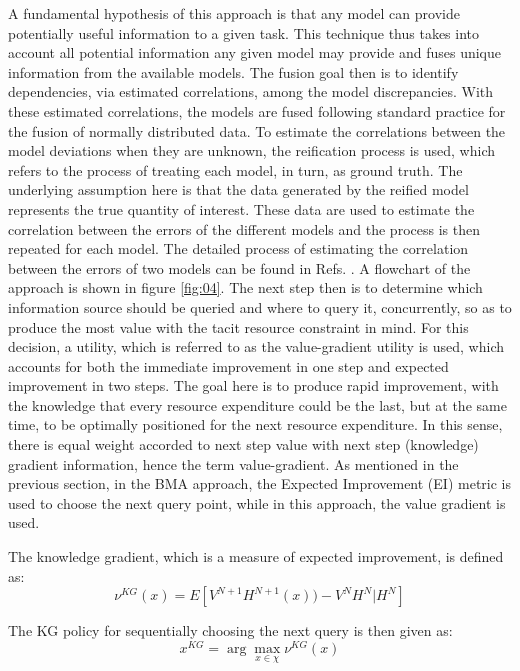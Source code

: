 \documentclass[utf8]{frontiersSCNS} %
\begin{document}
A fundamental hypothesis of this approach is that any model can provide potentially useful information to a given task. This technique thus takes into account all potential information any given model may provide and fuses unique information from the available models. The fusion goal then is to identify dependencies, via estimated correlations, among the model discrepancies. With these estimated correlations, the models are fused following standard practice for the fusion of normally distributed data.
To estimate the correlations between the model deviations when they are unknown, the reification process \cite{allaire2012fusing,thomison2017model} is used, which refers to the process of treating each model, in turn, as ground truth. The underlying assumption here is that the data generated by the reified model represents the true quantity of interest. These data are used to estimate the correlation between the errors of the different models and the process is then repeated for each model. The detailed process of estimating the correlation between the errors of two models can be found in Refs. \cite{allaire2012fusing,thomison2017model}. A flowchart of the approach is shown in figure \ref{fig:04}. The next step then is to determine which information source should be queried and where to query it, concurrently, so as to produce the most value  with the tacit resource constraint in mind. For this decision, a utility, which is referred to as the value-gradient utility is used, which accounts for  both the immediate improvement in one step and expected improvement in two steps. The goal here is to produce rapid improvement, with the knowledge that every resource expenditure could be the last, but at the same time, to  be optimally positioned for the next resource expenditure. In this sense, there is equal weight accorded to next step value with next step (knowledge) gradient information, hence the term value-gradient. As mentioned in the previous section, in the BMA approach, the Expected Improvement (EI) metric is used to choose the next query point, while in this approach, the value gradient is used.

The knowledge gradient, which is a measure of expected improvement, is defined as:
\begin{equation}
\nu^{KG}(x) = E [V^{N+1} H^{N+1}(x)) - V^N H^N| H^N]
\end{equation}

The KG policy for sequentially choosing the next query is then given as:
\begin{equation}
x^{KG} = \arg\!\max_{x \in \chi} \nu^{KG}(x)
\end{equation}
\end{document}
